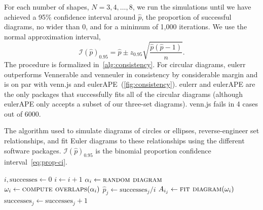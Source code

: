 \documentclass[
  oneside,
  openany,
  numbers=noendperiod,
  parskip=half,
  bibliography=totoc
]{scrbook}\usepackage[]{graphicx}\usepackage{xcolor}
\newcommand{\pkg}[1]{{\fontseries{b}\selectfont #1}}
\begin{document}
For each number of shapes, $N=3,4,\dots,8$, we run the simulations until we have
achieved a 95\% confidence interval around $\hat{p}$, the proportion of
successful diagrams, no wider than 0, and for a minimum of 1,000 iterations. We
use the normal approximation interval,
\begin{equation}
\mathcal{I}(\hat{p})_{0.95} = \hat{p} \pm z_{0.95}\sqrt{\frac{\hat{p}(\hat{p}-1)}{n}}.
\label{eq:prop-ci}
\end{equation}
The procedure is formalized in~\cref{alg:consistency}. For circular diagrams,
\pkg{eulerr} outperforms \pkg{Vennerable} and \pkg{venneuler} in
consistency by considerable margin and is on par with \pkg{venn.js} and
\pkg{eulerAPE}~(\cref{fig:consistency}). \pkg{eulerr} and \pkg{eulerAPE} are
the only packages that successfully fits all of the circular diagrams (although
\pkg{eulerAPE} only accepts a subset of our three-set diagrams).
\pkg{venn.js} fails in 4 cases out of
6000.

\begin{algorithm}[  hbtp]
\caption{The algorithm used to simulate diagrams of circles or ellipses,
reverse-engineer set relationships,
and fit Euler diagrams to these relationships using the different software packages.
$\mathcal{I}(\hat{p})_{0.95}$ is the binomial proportion confidence
interval~\eqref{eq:prop-ci}.\label{alg:consistency}}
\begin{algorithmic}
  \State $i, \text{successes} \gets 0$
  \Do
    \State $i \gets i + 1$
    \State $\alpha_i \gets \Call{random diagram}{}$
    \State $\omega_i \gets \Call{compute overlaps}{\alpha_i}$
      \State $\hat{p}_j \gets \text{successes}_j/i$
        \State $A_{i_j} \gets \Call{fit diagram}{\omega_i}$
          \State $\text{successes}_j \gets \text{successes}_j + 1$
        \EndIf
      \EndIf
    \EndFor
\EndFor
\end{algorithmic}
\end{algorithm}
\end{document}
